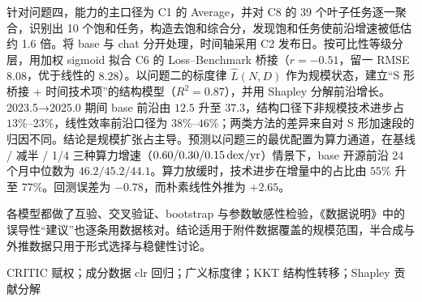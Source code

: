 针对问题四，能力的主口径为 C1 的 Average，并对 C8 的 39 个叶子任务逐一聚合，识别出 10 个饱和任务，构造去饱和综合分，发现饱和任务使前沿增速被低估约 1.6 倍。将 base 与 chat 分开处理，时间轴采用 C2 发布日。按可比性等级分层，用加权 sigmoid 拟合 C6 的 Loss–Benchmark 桥接（$r=-0.51$，留一 RMSE $8.08$，优于线性的 $8.28$）。以问题二的标度律 $\hat L(N,D)$ 作为规模状态，建立“S 形桥接 + 时间技术项”的结构模型（$R^2=0.87$），并用 Shapley 分解前沿增长。2023.5→2025.0 期间 base 前沿由 $12.5$ 升至 $37.3$，结构口径下非规模技术进步占 $13\%$–$23\%$，线性效率前沿口径为 $38\%$–$46\%$；两类方法的差异来自对 S 形加速段的归因不同。结论是规模扩张占主导。预测以问题三的最优配置为算力通道，在基线 / 减半 / 1/4 三种算力增速（$0.60/0.30/0.15\,\mathrm{dex}/\mathrm{yr}$）情景下，base 开源前沿 24 个月中位数为 $46.2/45.2/44.1$。算力放缓时，技术进步在增量中的占比由 $55\%$ 升至 $77\%$。回测误差为 $-0.78$，而朴素线性外推为 $+2.65$。

各模型都做了互验、交叉验证、bootstrap 与参数敏感性检验，《数据说明》中的误导性“建议”也逐条用数据核对。结论适用于附件数据覆盖的规模范围，半合成与外推数据只用于形式选择与稳健性讨论。

\vspace{6pt}
CRITIC 赋权；成分数据 clr 回归；广义标度律；KKT 结构性转移；Shapley 贡献分解
